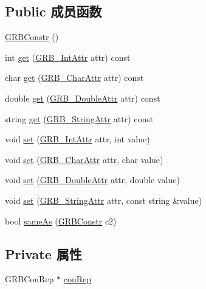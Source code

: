 \subsection*{Public 成员函数}
\begin{DoxyCompactItemize}
\item 
\hyperlink{classGRBConstr_ac7a7b5203b6cffaad14a24399e994043}{G\+R\+B\+Constr} ()
\item 
int \hyperlink{classGRBConstr_a3dc837b0f956fb87080f4b364bc1f029}{get} (\hyperlink{gurobi__c_09_09_8h_acfc136f6822be3d3e36ac84bd76b0900}{G\+R\+B\+\_\+\+Int\+Attr} attr) const 
\item 
char \hyperlink{classGRBConstr_afad4f42c56cda34c6eec119c9cc11b89}{get} (\hyperlink{gurobi__c_09_09_8h_a590e6aa44289cb0563eb6a382794dace}{G\+R\+B\+\_\+\+Char\+Attr} attr) const 
\item 
double \hyperlink{classGRBConstr_a10096d44f3ff74bbe0526c3f36b78702}{get} (\hyperlink{gurobi__c_09_09_8h_a2f43cc28447ce1778973a1f7961e8180}{G\+R\+B\+\_\+\+Double\+Attr} attr) const 
\item 
string \hyperlink{classGRBConstr_a85277dcd1d72ebcd40959d3c34b3f8f0}{get} (\hyperlink{gurobi__c_09_09_8h_a08ffa110d9b1684d689ae53300bb7ec1}{G\+R\+B\+\_\+\+String\+Attr} attr) const 
\item 
void \hyperlink{classGRBConstr_ab433a4700baf3f4e688fcf255ba5c357}{set} (\hyperlink{gurobi__c_09_09_8h_acfc136f6822be3d3e36ac84bd76b0900}{G\+R\+B\+\_\+\+Int\+Attr} attr, int value)
\item 
void \hyperlink{classGRBConstr_a4fbeb466208c38167d200d86b85b864e}{set} (\hyperlink{gurobi__c_09_09_8h_a590e6aa44289cb0563eb6a382794dace}{G\+R\+B\+\_\+\+Char\+Attr} attr, char value)
\item 
void \hyperlink{classGRBConstr_a8119bec391198e80c36b786d727ff488}{set} (\hyperlink{gurobi__c_09_09_8h_a2f43cc28447ce1778973a1f7961e8180}{G\+R\+B\+\_\+\+Double\+Attr} attr, double value)
\item 
void \hyperlink{classGRBConstr_a35ca6cdcd565a75854314db34e2c61da}{set} (\hyperlink{gurobi__c_09_09_8h_a08ffa110d9b1684d689ae53300bb7ec1}{G\+R\+B\+\_\+\+String\+Attr} attr, const string \&value)
\item 
bool \hyperlink{classGRBConstr_a7b54977cb61f3d141aa5069582ac3039}{same\+As} (\hyperlink{classGRBConstr}{G\+R\+B\+Constr} c2)
\end{DoxyCompactItemize}
\subsection*{Private 属性}
\begin{DoxyCompactItemize}
\item 
G\+R\+B\+Con\+Rep $\ast$ \hyperlink{classGRBConstr_a8a09f73543ba2fccfbe845696380ec2d}{con\+Rep}
\end{DoxyCompactItemize}
